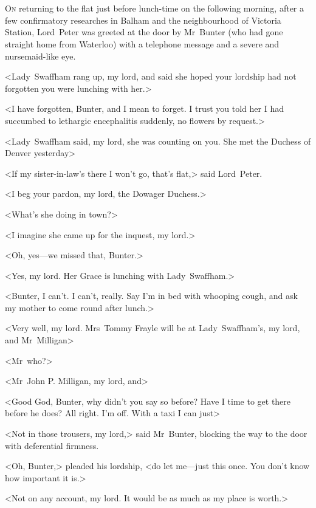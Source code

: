 \chapter[Chapter \thechapter]{}
\lettrine[lines=4]{O}{n} returning to the flat just before lunch-time on the following morning, after a few confirmatory researches in Balham and the neighbourhood of Victoria Station, Lord~Peter was greeted at the door by Mr~Bunter (who had gone straight home from Waterloo) with a telephone message and a severe and nursemaid-like eye.

<Lady~Swaffham rang up, my lord, and said she hoped your lordship had not forgotten you were lunching with her.>

<I have forgotten, Bunter, and I mean to forget. I trust you told her I had succumbed to lethargic encephalitis suddenly, no flowers by request.>

<Lady~Swaffham said, my lord, she was counting on you. She met the Duchess of Denver yesterday\longdash>

<If my sister-in-law's there I won't go, that's flat,> said Lord~Peter.

<I beg your pardon, my lord, the Dowager Duchess.>

<What's she doing in town?>

<I imagine she came up for the inquest, my lord.>

<Oh, yes—we missed that, Bunter.>

<Yes, my lord. Her Grace is lunching with Lady~Swaffham.>

<Bunter, I can't. I can't, really. Say I'm in bed with whooping cough, and ask my mother to come round after lunch.>

<Very well, my lord. Mrs~Tommy Frayle will be at Lady~Swaffham's, my lord, and Mr~Milligan\longdash>

<Mr~who?>

<Mr~John P\@. Milligan, my lord, and\longdash>

<Good God, Bunter, why didn't you say so before? Have I time to get there before he does? All right. I'm off. With a taxi I can just\longdash>

<Not in those trousers, my lord,> said Mr~Bunter, blocking the way to the door with deferential firmness.

<Oh, Bunter,> pleaded his lordship, <do let me—just this once. You don't know how important it is.>

<Not on any account, my lord. It would be as much as my place is worth.>

